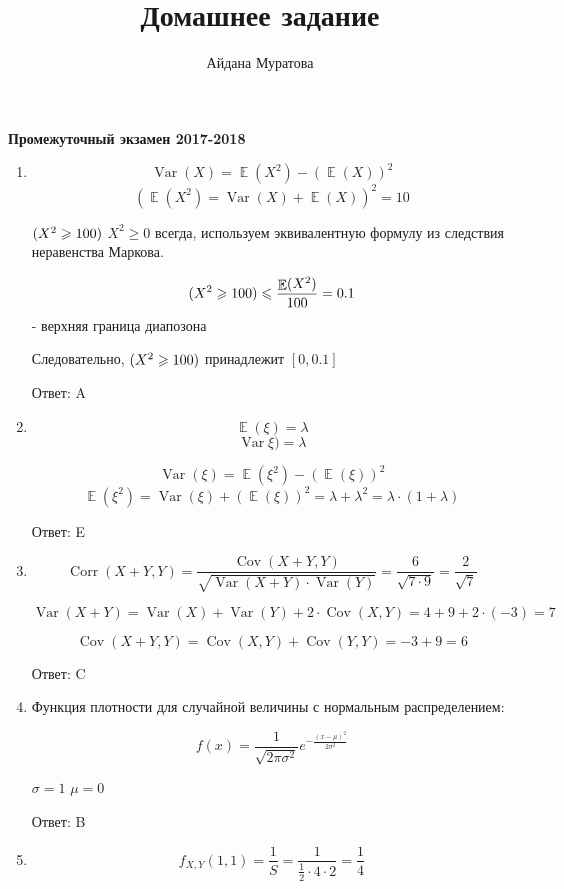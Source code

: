 \documentclass[a4paper,12pt]{article} %
\author{Айдана Муратова}
\title{Домашнее задание}
\DeclareMathOperator{\Var}{Var}
\DeclareMathOperator{\Cov}{Cov}
\DeclareMathOperator{\Corr}{Corr}
\DeclareMathOperator{\E}{\mathbb{E}}
\let\P\relax
\DeclareMathOperator{\P}{\mathbb{P}}
\renewcommand{\leq}{\leqslant}
\renewcommand{\geq}{\geqslant}
\begin{document}
\maketitle

\textbf{Промежуточный экзамен 2017-2018}

\begin{enumerate}

    \item

    \[ \Var(X) = \E(X^2) - (\E(X))^2 \]
    \[ (\E(X^2) = \Var(X) + \E(X))^2 = 10\]
    
    $\P(X^2 \geq 100)$ 
    $X^2 \geq 0$ всегда, используем эквивалентную формулу из следствия неравенства Маркова.
    
    \[\P(X^2 \geq 100) \leq \frac{\E(X^2)}{100} = 0.1 \] - верхняя граница диапозона
    
    Следовательно, $\P(X^2 \geq 100)$ принадлежит $[0, 0.1]$

    Ответ: A

    \item

    \[ \E(\xi) =\lambda \]
    \[ \Var\xi) =\lambda \]
    
    \[ \Var(\xi) = \E(\xi^2) - (\E(\xi))^2 \]
    \[ \E(\xi^2) = \Var(\xi) + (\E(\xi))^2 = \lambda + \lambda^2 = \lambda \cdot (1 + \lambda)\]

    Ответ: E

    \item
    
    \[ \Corr(X+Y,Y) = \frac{\Cov(X+Y,Y)}{\sqrt{\Var(X+Y)\cdot \Var(Y)}} = \frac{6}{\sqrt{7\cdot 9}} = \frac{2}{\sqrt{7}} \]

    \[ \Var(X+Y) = \Var(X) + \Var(Y) + 2 \cdot \Cov(X,Y) = 4 + 9 + 2 \cdot (-3) = 7 \]

    \[\Cov(X+Y,Y) = \Cov(X,Y) + \Cov(Y,Y) = -3 + 9 = 6\]

    Ответ: C
    
    \item
    
    Функция плотности для случайной величины с нормальным распределением:
    
    \[ f(x)=\frac{1}{\sqrt{2\pi\sigma^2}} e^{-\frac{(x-\mu)^2}{2\sigma^2}} \]
    
    $\sigma=1$ 
    $\mu=0$

    Ответ: B

    \item

    \[f_{X,Y}(1,1) = \frac{1}{S} = \frac{1}{\frac{1}{2}\cdot 4\cdot 2} = \frac{1}{4}\]


\end{enumerate}
\end{document}
